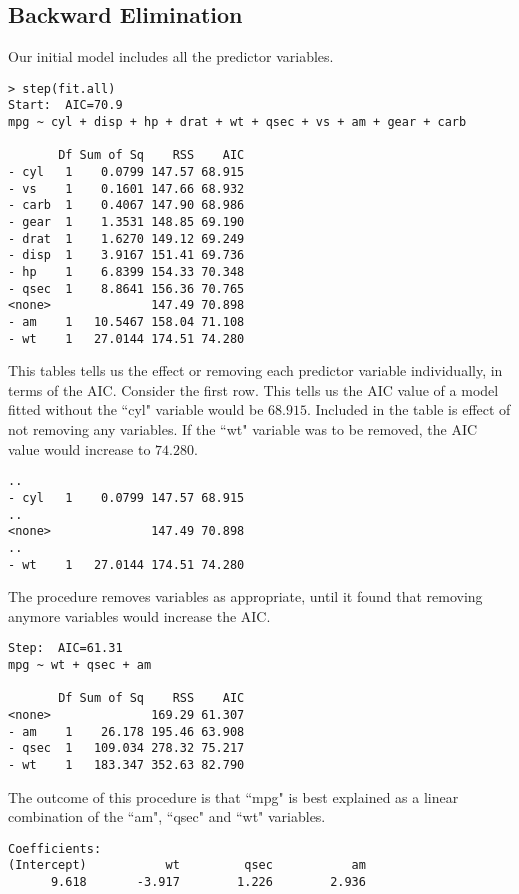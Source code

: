 \documentclass[12pt, a4paper]{report}
\theoremstyle{plain}
\theoremstyle{definition}
\theoremstyle{remark}
\begin{document}
\newpage
\subsection{Backward Elimination}
Our initial model includes all the predictor variables.
\begin{verbatim}
> step(fit.all)
Start:  AIC=70.9
mpg ~ cyl + disp + hp + drat + wt + qsec + vs + am + gear + carb

       Df Sum of Sq    RSS    AIC
- cyl   1    0.0799 147.57 68.915
- vs    1    0.1601 147.66 68.932
- carb  1    0.4067 147.90 68.986
- gear  1    1.3531 148.85 69.190
- drat  1    1.6270 149.12 69.249
- disp  1    3.9167 151.41 69.736
- hp    1    6.8399 154.33 70.348
- qsec  1    8.8641 156.36 70.765
<none>              147.49 70.898
- am    1   10.5467 158.04 71.108
- wt    1   27.0144 174.51 74.280
\end{verbatim}

This tables tells us the effect or removing each predictor variable individually, in terms of the AIC.
Consider the first row. This tells us the AIC value of a model fitted without the ``cyl" variable would be $68.915$.
Included in the table is effect of not removing any variables. If the ``wt" variable was to be removed, the AIC value would increase to $74.280$.
\begin{verbatim}
..
- cyl   1    0.0799 147.57 68.915
..
<none>              147.49 70.898
..
- wt    1   27.0144 174.51 74.280
\end{verbatim}

The procedure removes variables as appropriate, until it found that removing anymore variables would increase the AIC.
\begin{verbatim}
Step:  AIC=61.31
mpg ~ wt + qsec + am

       Df Sum of Sq    RSS    AIC
<none>              169.29 61.307
- am    1    26.178 195.46 63.908
- qsec  1   109.034 278.32 75.217
- wt    1   183.347 352.63 82.790
\end{verbatim}

The outcome of this procedure is that ``mpg" is best explained as a linear combination of the ``am", ``qsec" and ``wt" variables.

\begin{verbatim}
Coefficients:
(Intercept)           wt         qsec           am
      9.618       -3.917        1.226        2.936  
\end{verbatim}

\end{document}
